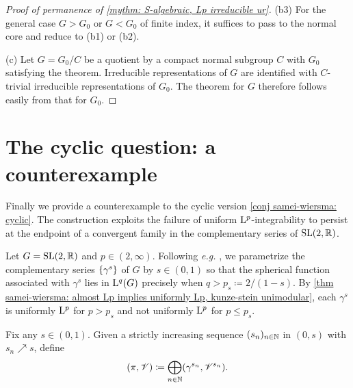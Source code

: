 \documentclass[a4paper, 10pt]{article}
\begin{document}
\begin{proof}[Proof of permanence of \autoref{mythm: S-algebraic, Lp irreducible ur}]
    (b3) For the general case $G>G_0$ or $G<G_0$ of finite index, it suffices to pass to the normal core and reduce to (b1) or (b2).

    (c) Let $G=G_0/C$ be a quotient by a compact normal subgroup $C$ with $G_0$ satisfying the theorem. Irreducible representations of $G$ are identified with $C$-trivial irreducible representations of $G_0$. The theorem for $G$ therefore follows easily from that for $G_0$.
\end{proof}



\section{The cyclic question: a counterexample}
    Finally we provide a counterexample to the cyclic version \autoref{conj samei-wiersma: cyclic}.
    The construction exploits the failure of uniform $\mathrm{L}^p$-integrability to persist at the endpoint of a convergent family in the complementary series of $\operatorname{SL}(2,\mathbb{R})$.

    Let $G=\operatorname{SL}(2,\mathbb{R})$ and $p\in(2,\infty)$.
    Following \emph{e.g.} \cite[\S9.5]{einsiedler-ward2025unitary}, we parametrize the complementary series $\left\{ \gamma^s \right\}$ of $G$ by $s\in (0,1)$ so that the spherical function associated with $\gamma^s$ lies in $\mathrm{L}^{q}(G)$ precisely when $q>p_s\coloneq 2/(1-s)$.
    By \autoref{thm samei-wiersma: almost Lp implies uniformly Lp, kunze-stein unimodular}, each $\gamma^s$ is uniformly $\mathrm{L}^p$ for $p>p_s$ and not uniformly $\mathrm{L}^p$ for $p\leq p_s$.

    Fix any $s\in (0,1)$. Given a strictly increasing sequence $(s_n)_{n\in\mathbb{N}}$ in $(0,s)$ with $s_n\nearrow s$, define
    \begin{equation*}
        (\pi, \mathscr{V}) \coloneq \bigoplus_{n\in\mathbb{N}} (\gamma^{s_n}, \mathscr{V}^{s_n}).
    \end{equation*}
\end{document}
